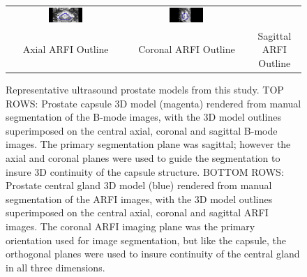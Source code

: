 \begin{figure}[htb!]
\begin{tabular}{ccc}
\includegraphics[width=0.3\textwidth]{zach/CG_Modeling_Images/Coronal_CG.png} &
\includegraphics[width=0.3\textwidth]{zach/CG_Modeling_Images/Sagittal_CG.png} \\
Axial ARFI Outline & Coronal ARFI Outline & Sagittal ARFI Outline \\
\end{tabular}
\caption{Representative ultrasound prostate models from this study.  TOP ROWS:
    Prostate capsule 3D model (magenta) rendered from manual segmentation of
    the B-mode images, with the 3D model outlines superimposed on the central
    axial, coronal and sagittal B-mode images.  The primary segmentation plane
    was sagittal; however the axial and coronal planes were used to guide the
    segmentation to insure 3D continuity of the capsule structure.  BOTTOM
    ROWS: Prostate central gland 3D model (blue) rendered from manual
    segmentation of the ARFI images, with the 3D model outlines superimposed on
    the central axial, coronal and sagittal ARFI images.  The coronal ARFI
    imaging plane was the primary orientation used for image segmentation, but
    like the capsule, the orthogonal planes were used to insure continuity of
    the central gland in all three dimensions.}
\label{fig:arfi_segs} 
\end{figure}
